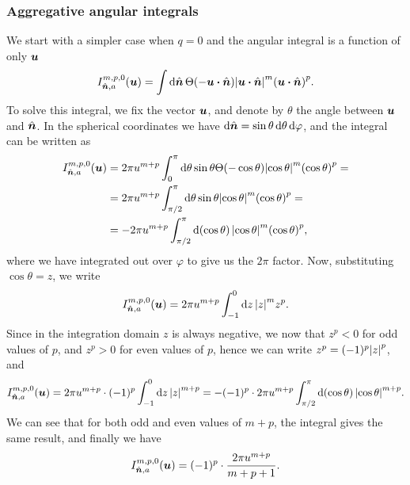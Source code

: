 \documentclass[aps,prl,preprint,groupedaddress,10pt]{revtex4-2}
\begin{document}
\subsubsection{Aggregative angular integrals}
We start with a simpler case when $q=0$ and the angular integral is a function of only $\vb*{u}$
\begin{equation}
    I_{\bn,a}^{m,p,0}(\bu)=\int\dd{\bn}\Theta\pqty{-\bu\vdot\bn}
    \abs{\bu\vdot\bn}^m\pqty{\bu\vdot\bn}^p.
\end{equation}
To solve this integral, we fix the vector $\vb*{u}$, and denote by $\theta$ the angle between
$\vb*{u}$ and $\hat{\vb*{n}}$. In the spherical coordinates we have
$\dd{\hat{\vb*{n}}}=\sin\theta\dd{\theta}\dd{\varphi}$, and the integral can be written as
\begin{equation}
    \begin{split}
        I_{\bn,a}^{m,p,0}(\bu)&=2\pi u^{m+p}\int_0^{\pi}\dd{\theta}\sin\theta
        \Theta\pqty{-\cos\theta}\abs{\cos\theta}^m\pqty{\cos\theta}^p=\\
        &=2\pi u^{m+p}\int_{\pi/2}^{\pi}\dd{\theta}\sin\theta
        \abs{\cos\theta}^m\pqty{\cos\theta}^p=\\
        &=-2\pi u^{m+p}\int_{\pi/2}^{\pi}\dd{\pqty{\cos\theta}}
        \abs{\cos\theta}^m\pqty{\cos\theta}^p,
    \end{split}
\end{equation}
where we have integrated out over $\varphi$ to give us the $2\pi$ factor. Now, substituting
$\cos\theta=z$, we write
\begin{equation}
    I_{\hat{\vb*{n}},a}^{m,p,0}(\vb*{u})=2\pi u^{m+p}\int_{-1}^{0}\dd{z}\abs{z}^m z^p.
\end{equation}
Since in the integration domain $z$ is always negative, we now that $z^p<0$ for odd values of
$p$, and $z^p>0$ for even values of $p$, hence we can write $z^p=(-1)^p\abs{z}^p$, and
\begin{equation}
    I_{\bn,a}^{m,p,0}(\bu)=2\pi u^{m+p}\cdot(-1)^p\int_{-1}^{0}\dd{z}\abs{z}^{m+p}=
    -(-1)^p\cdot 2\pi u^{m+p}\int_{\pi/2}^{\pi}\dd{\pqty{\cos\theta}}\abs{\cos\theta}^{m+p}.
\end{equation}
We can see that for both odd and even values of $m+p$, the integral gives the same result,
and finally we have
\begin{equation}
    I_{\hat{\vb*{n}},a}^{m,p,0}(\vb*{u})=(-1)^p\cdot\frac{2\pi u^{m+p}}{m+p+1}.
\end{equation}
\end{document}
